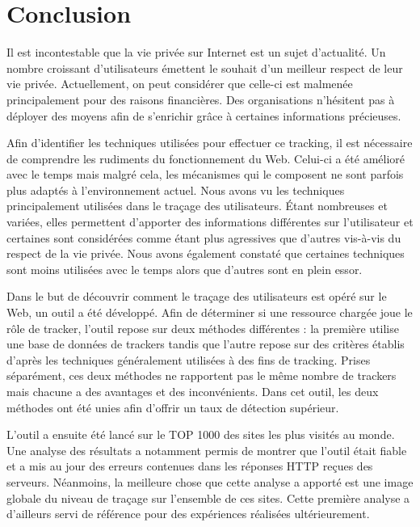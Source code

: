 \chapter{Conclusion}
Il est incontestable que la vie privée sur Internet est un sujet d'actualité. Un nombre croissant d'utilisateurs émettent le souhait d'un meilleur respect de leur vie privée. Actuellement, on peut considérer que celle-ci est malmenée principalement pour des raisons financières. Des organisations n'hésitent pas à déployer des moyens afin de s'enrichir grâce à certaines informations précieuses.
\newline

Afin d'identifier les techniques utilisées pour effectuer ce tracking, il est nécessaire de comprendre les rudiments du fonctionnement du Web. Celui-ci a été amélioré avec le temps mais malgré cela, les mécanismes qui le composent ne sont parfois plus adaptés à l'environnement actuel. Nous avons vu les techniques principalement utilisées dans le traçage des utilisateurs. Étant nombreuses et variées, elles permettent d'apporter des informations différentes sur l'utilisateur et certaines sont considérées comme étant plus agressives que d'autres vis-à-vis du respect de la vie privée. Nous avons également constaté que certaines techniques sont moins utilisées avec le temps alors que d'autres sont en plein essor.
\newline

Dans le but de découvrir comment le traçage des utilisateurs est opéré sur le Web, un outil a été développé. Afin de déterminer si une ressource chargée joue le rôle de tracker, l'outil repose sur deux méthodes différentes : la première utilise une base de données de trackers tandis que l'autre repose sur des critères établis d'après les techniques généralement utilisées à des fins de tracking. Prises séparément, ces deux méthodes ne rapportent pas le même nombre de trackers mais chacune a des avantages et des inconvénients. Dans cet outil, les deux méthodes ont été unies afin d'offrir un taux de détection supérieur.
\newline
\newpage

L'outil a ensuite été lancé sur le TOP 1000 des sites les plus visités au monde. Une analyse des résultats a notamment permis de montrer que l'outil était fiable et a mis au jour des erreurs contenues dans les réponses HTTP reçues des serveurs. Néanmoins, la meilleure chose que cette analyse a apporté est une image globale du niveau de traçage sur l'ensemble de ces sites. Cette première analyse a d'ailleurs servi de référence pour des expériences réalisées ultérieurement.
\newline

